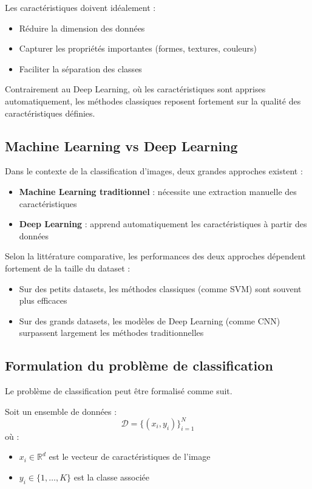 \documentclass[12pt,a4paper]{article}
\begin{document}
    Les caractéristiques doivent idéalement :
    \begin{itemize}
        \item Réduire la dimension des données
        \item Capturer les propriétés importantes (formes, textures, couleurs)
        \item Faciliter la séparation des classes
    \end{itemize}

    Contrairement au Deep Learning, où les caractéristiques sont apprises automatiquement, les méthodes classiques reposent fortement sur la qualité des caractéristiques définies.

    \subsection{Machine Learning vs Deep Learning}

    Dans le contexte de la classification d’images, deux grandes approches existent :
    \begin{itemize}
        \item \textbf{Machine Learning traditionnel} : nécessite une extraction manuelle des caractéristiques
        \item \textbf{Deep Learning} : apprend automatiquement les caractéristiques à partir des données
    \end{itemize}

    Selon la littérature comparative, les performances des deux approches dépendent fortement de la taille du dataset :
    \begin{itemize}
        \item Sur des petits datasets, les méthodes classiques (comme SVM) sont souvent plus efficaces
        \item Sur des grands datasets, les modèles de Deep Learning (comme CNN) surpassent largement les méthodes traditionnelles
    \end{itemize}

    \subsection{Formulation du problème de classification}

    Le problème de classification peut être formalisé comme suit.

    Soit un ensemble de données :
    \[
    \mathcal{D} = \{(x_i, y_i)\}_{i=1}^{N}
    \]
    où :
    \begin{itemize}
        \item \(x_i \in \mathbb{R}^d\) est le vecteur de caractéristiques de l’image
        \item \(y_i \in \{1, \dots, K\}\) est la classe associée
    \end{itemize}
\end{document}
